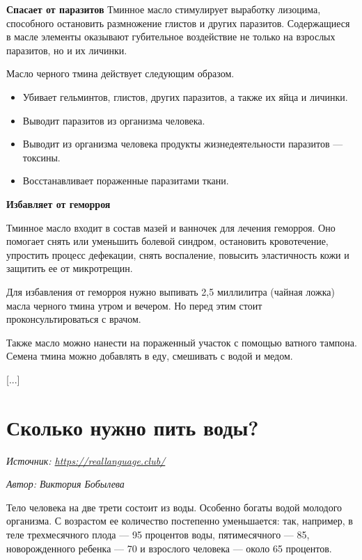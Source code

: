 \textbf{Спасает от паразитов}
Тминное масло стимулирует выработку лизоцима, способного остановить размножение глистов и других паразитов. Содержащиеся в масле элементы оказывают губительное воздействие не только на взрослых паразитов, но и их личинки.

Масло черного тмина действует следующим образом.

\begin{itemize}
    \item Убивает гельминтов, глистов, других паразитов, а также их яйца и личинки.
    \item Выводит паразитов из организма человека.
    \item Выводит из организма человека продукты жизнедеятельности паразитов — токсины.
    \item Восстанавливает пораженные паразитами ткани.
\end{itemize}

\textbf{Избавляет от геморроя}

Тминное масло входит в состав мазей и ванночек для лечения геморроя. Оно помогает снять или уменьшить болевой синдром, остановить кровотечение, упростить процесс дефекации, снять воспаление, повысить эластичность кожи и защитить ее от микротрещин.

Для избавления от геморроя нужно выпивать 2,5 миллилитра (чайная ложка) масла черного тмина утром и вечером. Но перед этим стоит проконсультироваться с врачом.

Также масло можно нанести на пораженный участок с помощью ватного тампона. Семена тмина можно добавлять в еду, смешивать с водой и медом.

[...]

\newpage
\section{Сколько нужно пить воды?}

\textit{Источник: \url{https://reallanguage.club/}}

\textit{Автор: Виктория Бобылева} %


Тело человека на две трети состоит из воды. Особенно богаты водой  молодого организма. С возрастом ее количество постепенно уменьшается: так, например, в теле трехмесячного плода --- 95 процентов воды, пятимесячного --- 85, новорожденного ребенка --- 70 и взрослого человека --- около 65 процентов.

